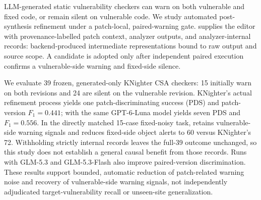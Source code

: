 LLM-generated static vulnerability checkers can warn on both vulnerable and fixed code, or remain silent on vulnerable code. We study automated post-synthesis refinement under a patch-local, paired-warning gate. \toolname supplies the editor with provenance-labelled patch context, analyzer outputs, and analyzer-internal records: backend-produced intermediate representations bound to raw output and source scope. A candidate is adopted only after independent paired execution confirms a vulnerable-side warning and fixed-side silence.

We evaluate 39 frozen, generated-only KNighter CSA checkers: 15 initially warn on both revisions and 24 are silent on the vulnerable revision. KNighter's actual refinement process yields one patch-discriminating success (PDS) and patch-version $F_1=0.441$; \toolname with the same GPT-6-Luna model yields seven PDS and $F_1=0.556$. In the directly matched 15-case fixed-noisy task, \toolname retains vulnerable-side warning signals and reduces fixed-side object alerts to 60 versus KNighter's 72. Withholding strictly internal records leaves the full-39 outcome unchanged, so this study does not establish a general causal benefit from those records. Runs with GLM-5.3 and GLM-5.3-Flash also improve paired-version discrimination. These results support bounded, automatic reduction of patch-related warning noise and recovery of vulnerable-side warning signals, not independently adjudicated target-vulnerability recall or unseen-site generalization.
